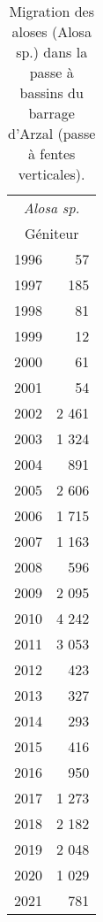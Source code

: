 \begin{table}[ht]
\centering
\begin{tabular}{lr}
  \toprule
  \multicolumn{2}{c}{\textit{Alosa sp.}}  \\ 
						\multicolumn{2}{c}{Géniteur} \\ \midrule
1996 & 57 \\ 
  1997 & 185 \\ 
  1998 & 81 \\ 
  1999 & 12 \\ 
  2000 & 61 \\ 
  2001 & 54 \\ 
  2002 & 2 461 \\ 
  2003 & 1 324 \\ 
  2004 & 891 \\ 
  2005 & 2 606 \\ 
  2006 & 1 715 \\ 
  2007 & 1 163 \\ 
  2008 & 596 \\ 
  2009 & 2 095 \\ 
  2010 & 4 242 \\ 
  2011 & 3 053 \\ 
  2012 & 423 \\ 
  2013 & 327 \\ 
  2014 & 293 \\ 
  2015 & 416 \\ 
  2016 & 950 \\ 
  2017 & 1 273 \\ 
  2018 & 2 182 \\ 
  2019 & 2 048 \\ 
  2020 & 1 029 \\ 
  2021 & 781 \\ 
   \bottomrule
\end{tabular}
\caption{Migration des aloses (Alosa sp.) dans la passe à bassins du barrage
				d'Arzal (passe à fentes verticales).} 
\label{table_bilanannuel_ala}
\end{table}
